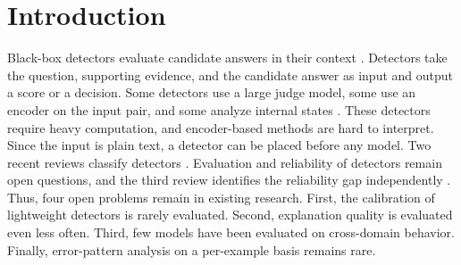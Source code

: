 \documentclass[a4paper,fleqn]{cas-sc}
\begin{document}
\begingroup
\hfuzz=120pt
\maketitle
\endgroup
{}
\linenumbers

\section{Introduction}\label{sec:intro}

Black-box detectors evaluate candidate answers in their context \cite{selfcheck,luna}. Detectors take the question, supporting evidence, and the candidate answer as input and output a score or a decision. Some detectors use a large judge model, some use an encoder on the input pair, and some analyze internal states \cite{farquhar2024semantic,ieeeTai}. These detectors require heavy computation, and encoder-based methods are hard to interpret. Since the input is plain text, a detector can be placed before any model. Two recent reviews classify detectors \cite{ji2023survey,huang2025survey}. Evaluation and reliability of detectors remain open questions, and the third review identifies the reliability gap independently \cite{alansari2026survey}. Thus, four open problems remain in existing research. First, the calibration of lightweight detectors is rarely evaluated. Second, explanation quality is evaluated even less often. Third, few models have been evaluated on cross-domain behavior. Finally, error-pattern analysis on a per-example basis remains rare.
\end{document}
